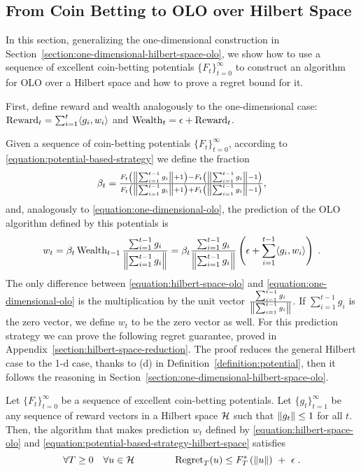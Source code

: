 \subsection{From Coin Betting to OLO over Hilbert Space}
\label{section:reduction_hilbert}

In this section, generalizing the
one-dimensional construction in
Section~\ref{section:one-dimensional-hilbert-space-olo}, we show how to use a sequence of excellent coin-betting
potentials $\{F_t\}_{t=0}^\infty$ to construct an algorithm for \ac{OLO} over a
Hilbert space and how to prove a regret bound for it.

First, define reward and wealth analogously to the one-dimensional case:
$\operatorname{Reward}_t = \sum_{i=1}^t \langle g_i, w_i \rangle$ and $\operatorname{Wealth}_t = \epsilon +
\operatorname{Reward}_t$.

Given a sequence of coin-betting potentials $\{F_t\}_{t=0}^\infty$, according
to \eqref{equation:potential-based-strategy} we define the fraction
\begin{equation}
\label{equation:potential-based-strategy-hilbert-space}
\beta_t = \tfrac{F_t \left(\left\|{\sum_{i=1}^{t-1} g_i}\right\| + 1\right) - F_t\left(\left\|{\sum_{i=1}^{t-1} g_i}\right\| - 1 \right)}{F_t\left(\left\|{\sum_{i=1}^{t-1} g_i}\right\| + 1 \right) + F_t\left(\left\|{\sum_{i=1}^{t-1} g_i}\right\| - 1 \right)},
\end{equation}
and, analogously to \eqref{equation:one-dimensional-olo}, the prediction of the OLO algorithm
defined by this potentials is
\begin{equation}
\label{equation:hilbert-space-olo}
w_t = \beta_t \operatorname{Wealth}_{t-1} \frac{\sum_{i=1}^{t-1} g_i}{\left\|{\sum_{i=1}^{t-1} g_i}\right\|}
= \beta_t \frac{\sum_{i=1}^{t-1} g_i}{\left\|{\sum_{i=1}^{t-1} g_i}\right\|} \left(\epsilon+ \sum_{i=1}^{t-1} \langle g_i, w_i\rangle \right) \; .
\end{equation}
The only difference between \eqref{equation:hilbert-space-olo} and
\eqref{equation:one-dimensional-olo} is the multiplication by the unit vector
$\frac{\sum_{i=1}^{t-1} g_i}{\left\|{\sum_{i=1}^{t-1} g_i}\right\|}$. If $\sum_{i=1}^{t-1}
g_i$ is the zero vector, we define $w_t$ to be the zero vector as well.  For this
prediction strategy we can prove the following regret guarantee, proved in
Appendix~\ref{section:hilbert-space-reduction}.  The proof reduces the general
Hilbert case to the 1-d case, thanks to (d) in
Definition~\ref{definition:potential}, then it follows the  reasoning in
Section~\ref{section:one-dimensional-hilbert-space-olo}.
%
\begin{theorem}
\label{theorem:hilbert-space-olo-regret-bound}
Let $\{F_t\}_{t=0}^\infty$ be a sequence of excellent coin-betting potentials.
Let $\{g_t\}_{t=1}^\infty$ be any sequence of reward vectors in a Hilbert space
$\mathcal{H}$ such that $\left\|{g_t}\right\| \le 1$ for all $t$. Then, the algorithm that makes
prediction $w_t$ defined by \eqref{equation:hilbert-space-olo} and
\eqref{equation:potential-based-strategy-hilbert-space} satisfies
\[
\forall T \ge 0 \quad
\forall u \in \mathcal{H} \qquad \qquad
\operatorname{Regret}_T(u) \le F_T^*\left(\left\|{u}\right\| \right) \ + \ \epsilon \; .
\]
\end{theorem}
